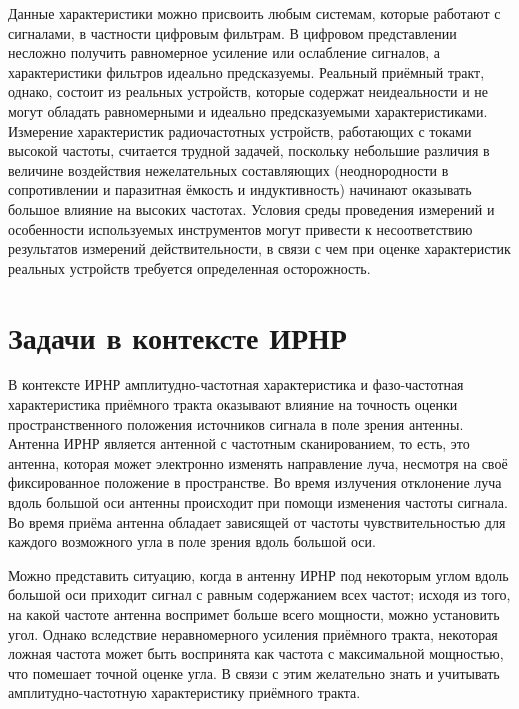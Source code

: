 \documentclass{report}
\begin{document}
Данные характеристики можно присвоить любым системам, которые работают с сигналами, в частности цифровым фильтрам. В цифровом представлении несложно получить равномерное усиление или ослабление сигналов, а характеристики фильтров идеально предсказуемы. Реальный приёмный тракт, однако, состоит из реальных устройств, которые содержат неидеальности и не могут обладать равномерными и идеально предсказуемыми характеристиками. Измерение характеристик радиочастотных устройств, работающих с токами высокой частоты, считается трудной задачей, поскольку небольшие различия в величине воздействия нежелательных составляющих (неоднородности в сопротивлении и паразитная ёмкость и индуктивность) начинают оказывать большое влияние на высоких частотах. Условия среды проведения измерений и особенности используемых инструментов могут привести к несоответствию результатов измерений действительности, в связи с чем при оценке характеристик реальных устройств требуется определенная осторожность.

\section{Задачи в контексте ИРНР}

В контексте ИРНР амплитудно-частотная характеристика и фазо-частотная характеристика приёмного тракта оказывают влияние на точность оценки пространственного положения источников сигнала в поле зрения антенны. Антенна ИРНР является антенной с частотным сканированием, то есть, это антенна, которая может электронно изменять направление луча, несмотря на своё фиксированное положение в пространстве. Во время излучения отклонение луча вдоль большой оси антенны происходит при помощи изменения частоты сигнала. Во время приёма антенна обладает зависящей от частоты чувствительностью для каждого возможного угла в поле зрения вдоль большой оси.

Можно представить ситуацию, когда в антенну ИРНР под некоторым углом вдоль большой оси приходит сигнал с равным содержанием всех частот; исходя из того, на какой частоте антенна воспримет больше всего мощности, можно установить угол. Однако вследствие неравномерного усиления приёмного тракта, некоторая ложная частота может быть воспринята как частота с максимальной мощностью, что помешает точной оценке угла. В связи с этим желательно знать и учитывать амплитудно-частотную характеристику приёмного тракта.
\end{document}
